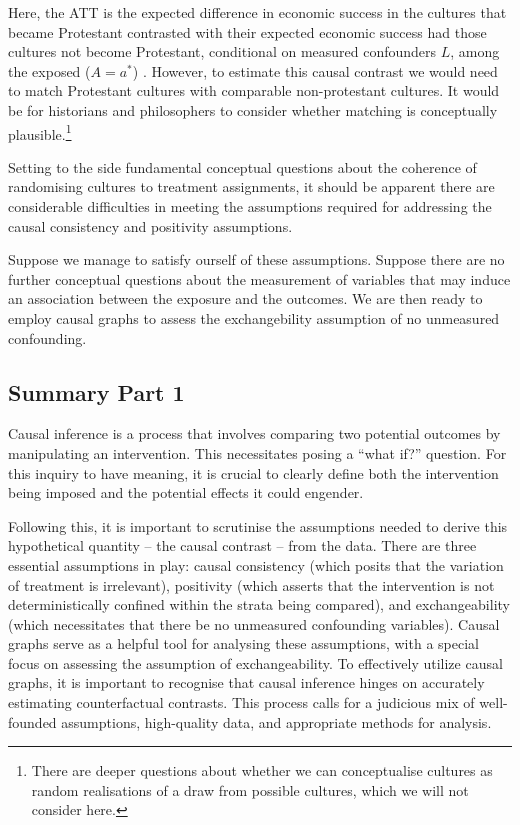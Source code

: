\documentclass[
  singlecolumn]{report}
\begin{document}
Here, the ATT is the expected difference in economic success in the
cultures that became Protestant contrasted with their expected economic
success had those cultures not become Protestant, conditional on
measured confounders \(L\), among the exposed (\(A = a^*\)) . However,
to estimate this causal contrast we would need to match Protestant
cultures with comparable non-protestant cultures. It would be for
historians and philosophers to consider whether matching is conceptually
plausible.\footnote{There are deeper questions about whether we can
  conceptualise cultures as random realisations of a draw from possible
  cultures, which we will not consider here.}

Setting to the side fundamental conceptual questions about the coherence
of randomising cultures to treatment assignments, it should be apparent
there are considerable difficulties in meeting the assumptions required
for addressing the causal consistency and positivity assumptions.

Suppose we manage to satisfy ourself of these assumptions. Suppose there
are no further conceptual questions about the measurement of variables
that may induce an association between the exposure and the outcomes. We
are then ready to employ causal graphs to assess the exchangebility
assumption of no unmeasured confounding.

\hypertarget{summary-part-1}{%
\subsection{Summary Part 1}\label{summary-part-1}}

Causal inference is a process that involves comparing two potential
outcomes by manipulating an intervention. This necessitates posing a
``what if?'' question. For this inquiry to have meaning, it is crucial
to clearly define both the intervention being imposed and the potential
effects it could engender.

Following this, it is important to scrutinise the assumptions needed to
derive this hypothetical quantity -- the causal contrast -- from the
data. There are three essential assumptions in play: causal consistency
(which posits that the variation of treatment is irrelevant), positivity
(which asserts that the intervention is not deterministically confined
within the strata being compared), and exchangeability (which
necessitates that there be no unmeasured confounding variables). Causal
graphs serve as a helpful tool for analysing these assumptions, with a
special focus on assessing the assumption of exchangeability. To
effectively utilize causal graphs, it is important to recognise that
causal inference hinges on accurately estimating counterfactual
contrasts. This process calls for a judicious mix of well-founded
assumptions, high-quality data, and appropriate methods for analysis.
\end{document}
